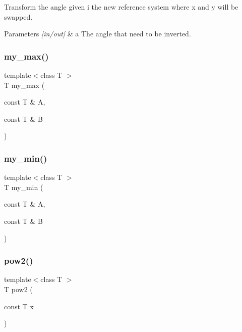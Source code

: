 Transform the angle given i the new reference system where x and y will be swapped. 


\begin{DoxyParams}{Parameters}
{\em \mbox{[}in/out\mbox{]}} & a The angle that need to be inverted. \\
\hline
\end{DoxyParams}
\mbox{\label{maths_8hh_ab5d415a0bb0219a327f458c94fe972d3}} 
\subsubsection{\texorpdfstring{my\_max()}{my\_max()}}
{\footnotesize\ttfamily template$<$class T $>$ \\
T my\+\_\+max (\begin{DoxyParamCaption}\item[{const T \&}]{A,  }\item[{const T \&}]{B }\end{DoxyParamCaption})\hspace{0.3cm}{\ttfamily [inline]}}

\mbox{\label{maths_8hh_ad7d1cdfd24f29909819edf72add024a3}} 
\subsubsection{\texorpdfstring{my\_min()}{my\_min()}}
{\footnotesize\ttfamily template$<$class T $>$ \\
T my\+\_\+min (\begin{DoxyParamCaption}\item[{const T \&}]{A,  }\item[{const T \&}]{B }\end{DoxyParamCaption})\hspace{0.3cm}{\ttfamily [inline]}}

\mbox{\label{maths_8hh_a054f7427a96b10baa550060a0376584c}} 
\subsubsection{\texorpdfstring{pow2()}{pow2()}}
{\footnotesize\ttfamily template$<$class T $>$ \\
T pow2 (\begin{DoxyParamCaption}\item[{const T}]{x }\end{DoxyParamCaption})\hspace{0.3cm}{\ttfamily [inline]}}



